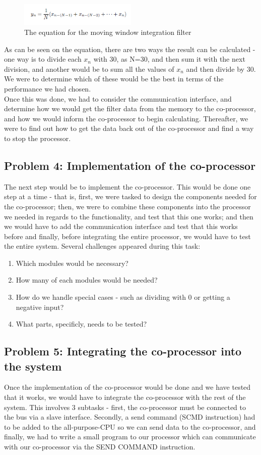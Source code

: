 \documentclass[12pt,a4paper]{article}
\begin{document}
	\begin{figure}[h!]
	  \centering
	    \includegraphics[width=0.5\textwidth]{Equation1.png}
	  \caption{The equation for the moving window integration filter}
	\end{figure}
	
	As can be seen on the equation, there are two ways the result can be calculated - one way is to divide each $x_n$ with 30, as N=30, and then sum it with the next division, and another would be to sum all the values of $x_n$ and then divide by 30. We were to determine which of these would be the best in terms of the performance we had chosen.\\
	Once this was done, we had to consider the communication interface, and determine how we would get the filter data from the memory to the co-processor, and how we would inform the co-processor to begin calculating. Thereafter, we were to find out how to get the data back out of the co-processor and find a way to stop the processor.

\subsection{Problem 4: Implementation of the co-processor}
	The next step would be to implement the co-processor. This would be done one step at a time - that is, first, we were tasked to design the components needed for the co-processor; then, we were to combine these components into the processor we needed in regards to the functionality, and test that this one works; and then we would have to add the communication interface and test that this works before and finally, before integrating the entire processor, we would have to test the entire system.
	Several challenges appeared during this task:
	\begin{enumerate}
		\item Which modules would be necessary?
		\item How many of each modules would be needed?
		\item How do we handle special cases - such as dividing with 0 or getting a negative input?
		\item What parts, specificly, needs to be tested?
	\end{enumerate}
\subsection{Problem 5: Integrating the co-processor into the system}
	Once the implementation of the co-processor would be done and we have tested that it works, we would have to integrate the co-processor with the rest of the system. This involves 3 subtasks - first, the co-processor must be connected to the bus via a slave interface. Secondly, a send command (SCMD instruction) had to be added to the all-purpose-CPU so we can send data to the co-processor, and finally, we had to write a small program to our processor which can communicate with our co-processor via the SEND COMMAND instruction.
\end{document}
